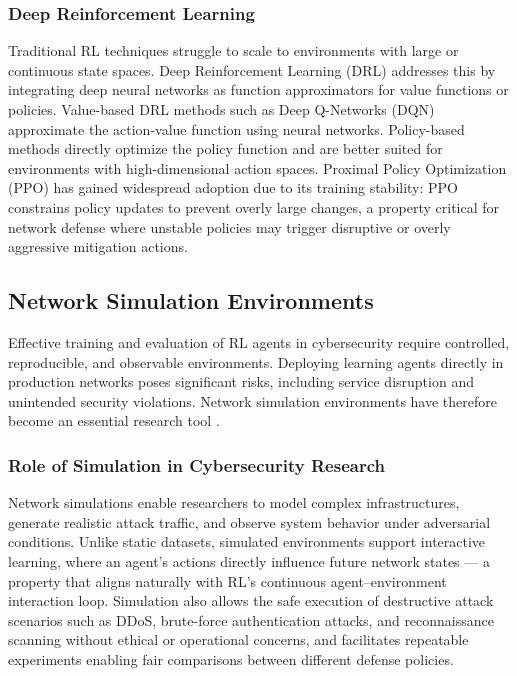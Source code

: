 \documentclass[conference]{IEEEtran}
\begin{document}
\subsubsection{Deep Reinforcement Learning}
Traditional RL techniques struggle to scale to environments with large or
continuous state spaces. Deep Reinforcement Learning (DRL) addresses this
by integrating deep neural networks as function approximators for value
functions or policies. Value-based DRL methods such as Deep Q-Networks
(DQN) \cite{mnih2015dqn} approximate the action-value function using
neural networks. Policy-based methods directly optimize the policy function
and are better suited for environments with high-dimensional action spaces.
Proximal Policy Optimization (PPO) \cite{schulman2017ppo} has gained
widespread adoption due to its training stability: PPO constrains policy
updates to prevent overly large changes, a property critical for network
defense where unstable policies may trigger disruptive or overly aggressive
mitigation actions.

\subsection{Network Simulation Environments}

Effective training and evaluation of RL agents in cybersecurity require
controlled, reproducible, and observable environments. Deploying learning
agents directly in production networks poses significant risks, including
service disruption and unintended security violations. Network simulation
environments have therefore become an essential research tool
\cite{peuster2016containernet}.

\subsubsection{Role of Simulation in Cybersecurity Research}
Network simulations enable researchers to model complex infrastructures,
generate realistic attack traffic, and observe system behavior under
adversarial conditions. Unlike static datasets, simulated environments
support interactive learning, where an agent's actions directly influence
future network states --- a property that aligns naturally with RL's
continuous agent--environment interaction loop. Simulation also allows the
safe execution of destructive attack scenarios such as DDoS, brute-force
authentication attacks, and reconnaissance scanning without ethical or
operational concerns, and facilitates repeatable experiments enabling fair
comparisons between different defense policies.
\end{document}

